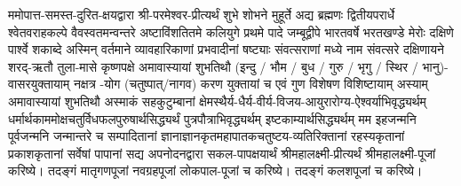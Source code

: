 




\shuklambaradharam

\pranayama


ममोपात्त-समस्त-दुरित-क्षयद्वारा श्री-परमेश्वर-प्रीत्यर्थं शुभे शोभने मुहूर्ते अद्य ब्रह्मणः
द्वितीयपरार्धे श्वेतवराहकल्पे वैवस्वतमन्वन्तरे अष्टाविंशतितमे कलियुगे प्रथमे पादे
जम्बूद्वीपे भारतवर्षे भरतखण्डे मेरोः दक्षिणे पार्श्वे शकाब्दे अस्मिन् वर्तमाने व्यावहारिकाणां प्रभवादीनां षष्ट्याः संवत्सराणां मध्ये \blank{} नाम संवत्सरे दक्षिणायने
शरद्-ऋतौ तुला-मासे कृष्णपक्षे अमावास्यायां शुभतिथौ
(इन्दु / भौम / बुध / गुरु / भृगु / स्थिर / भानु)-वासरयुक्तायाम्
\blank{} नक्षत्र \blank{}-योग (चतुष्पात्/नागव) करण युक्तायां च एवं गुण विशेषण विशिष्टायाम्
अस्याम् अमावास्यायां शुभतिथौ
अस्माकं सहकुटुम्बानां क्षेमस्थैर्य-धैर्य-वीर्य-विजय-आयुरारोग्य-ऐश्वर्याभिवृद्ध्यर्थम्
 धर्मार्थकाममोक्ष\-चतुर्विधफलपुरुषार्थसिद्ध्यर्थं पुत्रपौत्राभि\-वृद्ध्यर्थम् इष्टकाम्यार्थसिद्ध्यर्थम्
मम इहजन्मनि पूर्वजन्मनि जन्मान्तरे च सम्पादितानां ज्ञानाज्ञानकृतमहा\-पातकचतुष्टय-व्यतिरिक्तानां रहस्यकृतानां प्रकाशकृतानां सर्वेषां पापानां सद्य अपनोदनद्वारा सकल-पापक्षयार्थं
श्रीमहालक्ष्मी-प्रीत्यर्थं श्रीमहालक्ष्मी-पूजां करिष्ये। तदङ्गं मातृगणपूजां नवग्रहपूजां लोकपाल-पूजां च करिष्ये।
तदङ्गं कलशपूजां च करिष्ये।

